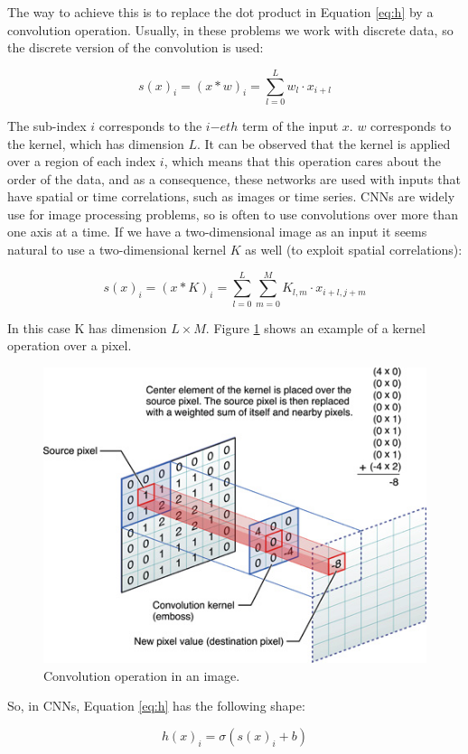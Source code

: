 \begin{enumerate}
The way to achieve this is to replace the dot product in Equation \ref{eq:h} by a convolution operation. Usually, in these problems we work with discrete data, so the discrete version of the convolution is used:

\begin{equation}
    s(x)_{i} = (x * w)_{i} = \sum_{l=0}^{L}w_{l} \cdot x_{i+l}
\end{equation}
    
The sub-index $i$ corresponds to the $i\mathrm{-}eth$ term of the input $x$. $w$ corresponds to the kernel, which has dimension $L$. It can be observed that the kernel is applied over a region of each index $i$, which means that this operation cares about the order of the data, and as a consequence, these networks are used with inputs that have spatial or time correlations, such as images or time series. CNNs are widely use for image processing problems, so is often to use convolutions over more than one axis at a time. If we have a two-dimensional image as an input it seems natural to use a two-dimensional kernel $K$ as well (to exploit spatial correlations):

\begin{equation}
    s(x)_{i} = (x * K)_{i} = \sum_{l=0}^{L}\sum_{m=0}^{M}K_{l, m} \cdot x_{i+l, j+m}
\end{equation}

In this case K has dimension $L \times M$. Figure \ref{fig:conv} shows an example of a kernel operation over a pixel.

\begin{figure}[H]
    \centering
    \includegraphics[width=0.4\linewidth]{imagenes/cap1/convolution.jpg}
    \caption{Convolution operation in an image.}
    \label{fig:conv}
\end{figure}

So, in CNNs, Equation \ref{eq:h} has the following shape:

\begin{equation}
    h(x)_{i} = \sigma(s(x)_{i} + b)
    \label{eq:h2}
\end{equation}


\end{enumerate}
